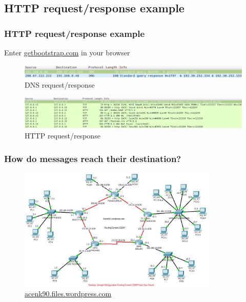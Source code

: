 \subsection{HTTP request/response example}
\begin{frame}
    \frametitle{HTTP request/response example}
      Enter \color{blue}\href{http://getbootstrap.com}{getbootstrap.com} \color{black} in your browser\pause
      \begin{figure}
    \includegraphics[width=11.5cm]{./imgs/dns-req.png}
  \caption{DNS request/response}
      \end{figure}
      \pause
      \begin{figure}
    \includegraphics[trim = 0 0 100mm 0, clip, width=11.5cm]{./imgs/http-req.png}
  \caption{HTTP request/response}
      \end{figure}
  \end{frame}
    \begin{frame}
    \frametitle{How do messages reach their destination?}
      \begin{figure}
    \includegraphics[width=9.5cm]{./imgs/routing.jpg}
  \caption{\color{blue}\href{http://acenk90.files.wordpress.com}{acenk90.files.wordpress.com}}
  \label{fig:routing}
      \end{figure}
  \end{frame}
